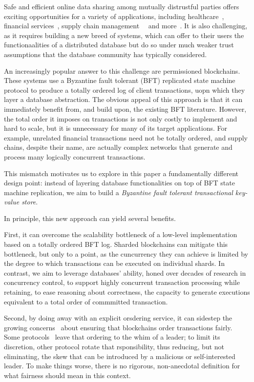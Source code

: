 Safe and efficient online data sharing among mutually distrustful
parties offers exciting opportunities for a variety of applications,
including healthcare~\cite{}, financial services~\cite{}, supply chain
management~~\cite{} and more~\cite{}. It is also challenging, as it
requires building a new breed of systems, which can offer to their
users the functionaalities of a distributed database but do so under
much weaker trust assumptions that the database community has
typically considered.

An increasingly popular answer to this challenge are permissioned
blockchains. These systems use a Byzantine fault tolerant (BFT)
replicated state machine protocol\cite{} to produce a totally ordered
log of client transactions, uopn which they layer a database
abstraction.  The obvious appeal of this approach is that it can
immediately benefit from, and  build upon, the existing BFT
literature. However, the total order it imposes on transactions is not
only costly to implement and hard to scale, but it is unnecessary for
many of its target applications. For example, unrelated financial
transactions need not be totally ordered, and supply chains, despite
their name, are actually complex networks that generate and process
many logically concurrent transactions.

This mismatch motivates us to explore in this paper a fundamentally
different design point: instead of layering database functionalities on top
of BFT state machine replication, we aim to build  a
{\em Byzantine fault tolerant transactional key-value store}.

In principle, this new approach can yield several benefits.

First, it can overcome the scalability bottleneck of a low-level
implementation based on a totally ordered BFT log. Sharded blockchains
can mitigate this bottleneck, but only to a point, as the cuncurrency
they can achieve is limited by the degree to which transactions can be
executed on individual shards. In contrast, we aim to leverage
databases' ability, honed over decades of research in concurrency
control, to support highly concurrent transaction processing while
retaining, to ease reasoning about correctness, the capacity to
generate executions equivalent to a total order of commmitted
transaction.


Second, by doing away with an explicit orsdering service, it can
sidestep the growing concerns~\cite{} about ensuring that blockchains order
transactions fairly. Some protocols~\cite{} leave that ordering to the
whim of a leader; to limit its discretion, other protocol rotate
that rsponsibility, thus reducing, but not eliminating, the skew that can be
introduced by a malicious or self-interested leader. To make things
worse, there is no rigorous, non-anecdotal definition for what
fairness should mean in this context.

